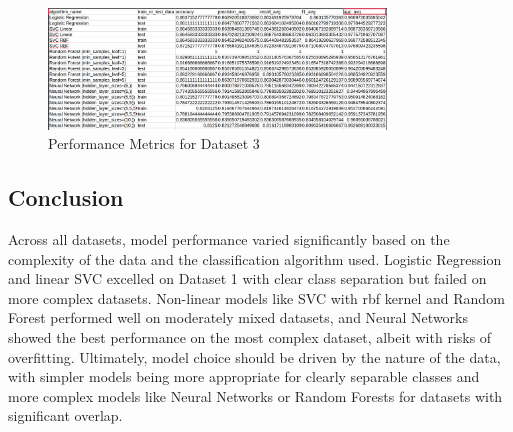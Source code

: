 \begin{figure}[H]
    \centering
    \includegraphics[width=0.8\textwidth]{Images/dataset-3-step6.png}
    \caption{Performance Metrics for Dataset 3}
\end{figure}

\subsection*{Conclusion}
Across all datasets, model performance varied significantly based on the complexity of the data and the classification algorithm used. Logistic Regression and linear SVC excelled on Dataset 1 with clear class separation but failed on more complex datasets. Non-linear models like SVC with rbf kernel and Random Forest performed well on moderately mixed datasets, and Neural Networks showed the best performance on the most complex dataset, albeit with risks of overfitting. Ultimately, model choice should be driven by the nature of the data, with simpler models being more appropriate for clearly separable classes and more complex models like Neural Networks or Random Forests for datasets with significant overlap.




